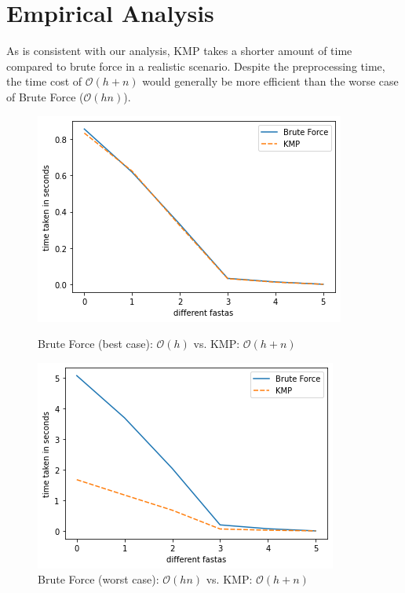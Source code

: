 \section*{Empirical Analysis}

As is consistent with our analysis, KMP takes a shorter amount of time compared to brute force in a realistic scenario. Despite the preprocessing time, the time cost  of $\mathcal{O}(h+n)$ would generally be more efficient than the worse case of Brute Force ($\mathcal{O}(hn)$).

\begin{figure}[H]
  \centering
  \begin{minipage}[b]{0.49\textwidth}
    \includegraphics[width=\textwidth]{images/brute-force-best.png}
    \caption{Brute Force (best case): $\mathcal{O}(h)$ vs. KMP: $\mathcal{O}(h+n)$}
    \label{fig:bf_best}
  \end{minipage}
  \hfill
  \begin{minipage}[b]{0.49\textwidth}
    \includegraphics[width=\textwidth]{images/brute-force-worst.png}
    \caption{Brute Force (worst case): $\mathcal{O}(hn)$ vs. KMP: $\mathcal{O}(h+n)$}
    \label{fig:bf_worst}
  \end{minipage}
\end{figure}

